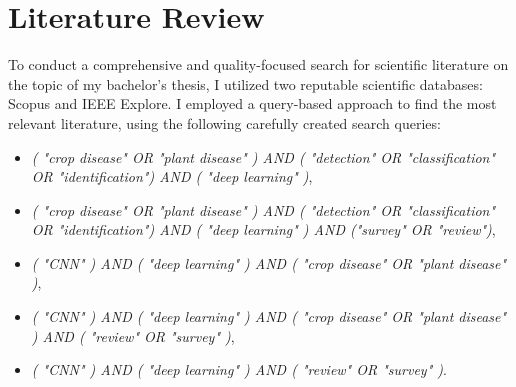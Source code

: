 \documentclass{BachelorBUI}
\begin{document}
\section{Literature Review}
To conduct a comprehensive and quality-focused search for scientific literature on the topic of my bachelor's thesis, I utilized two reputable scientific databases: Scopus and IEEE Explore. 
I employed a query-based approach to find the most relevant literature, using the following carefully created search queries: 
\begin{itemize}
    \item \textit{( "crop disease" OR "plant disease" ) AND ( "detection" OR "classification" OR "identification") AND ( "deep learning" )}, 
    \item \textit{( "crop disease" OR "plant disease" ) AND ( "detection" OR "classification" OR "identification") AND ( "deep learning" )  AND ("survey" OR "review")}, 
    \item \textit{( "CNN" ) AND ( "deep learning" ) AND ( "crop disease" OR "plant disease" )},
    \item \textit{( "CNN" ) AND ( "deep learning" ) AND ( "crop disease" OR "plant disease" ) AND ( "review" OR "survey" )},
    \item \textit{( "CNN" ) AND ( "deep learning" ) AND ( "review" OR "survey" )}.
\end{itemize}
\end{document}
